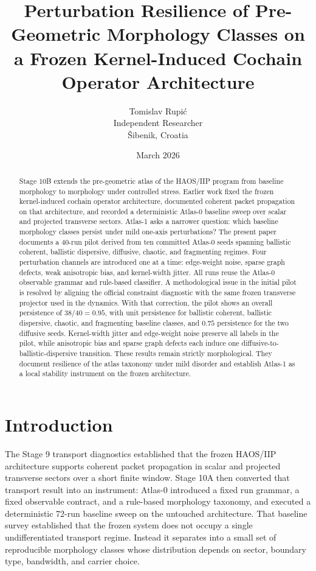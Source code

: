 \documentclass[11pt]{article}
\title{Perturbation Resilience of Pre-Geometric Morphology Classes on a Frozen Kernel-Induced Cochain Operator Architecture}
\author{Tomislav Rupi\'c\\Independent Researcher\\\v{S}ibenik, Croatia}
\date{March 2026}
\begin{document}
\maketitle

\begin{abstract}
Stage 10B extends the pre-geometric atlas of the HAOS/IIP program from baseline morphology to morphology under controlled stress. Earlier work fixed the frozen kernel-induced cochain operator architecture, documented coherent packet propagation on that architecture, and recorded a deterministic Atlas-0 baseline sweep over scalar and projected transverse sectors. Atlas-1 asks a narrower question: which baseline morphology classes persist under mild one-axis perturbations? The present paper documents a 40-run pilot derived from ten committed Atlas-0 seeds spanning ballistic coherent, ballistic dispersive, diffusive, chaotic, and fragmenting regimes. Four perturbation channels are introduced one at a time: edge-weight noise, sparse graph defects, weak anisotropic bias, and kernel-width jitter. All runs reuse the Atlas-0 observable grammar and rule-based classifier. A methodological issue in the initial pilot is resolved by aligning the official constraint diagnostic with the same frozen transverse projector used in the dynamics. With that correction, the pilot shows an overall persistence of $38/40 = 0.95$, with unit persistence for ballistic coherent, ballistic dispersive, chaotic, and fragmenting baseline classes, and $0.75$ persistence for the two diffusive seeds. Kernel-width jitter and edge-weight noise preserve all labels in the pilot, while anisotropic bias and sparse graph defects each induce one diffusive-to-ballistic-dispersive transition. These results remain strictly morphological. They document resilience of the atlas taxonomy under mild disorder and establish Atlas-1 as a local stability instrument on the frozen architecture.
\end{abstract}

\section{Introduction}
The Stage 9 transport diagnostics established that the frozen HAOS/IIP architecture supports coherent packet propagation in scalar and projected transverse sectors over a short finite window. Stage 10A then converted that transport result into an instrument: Atlas-0 introduced a fixed run grammar, a fixed observable contract, and a rule-based morphology taxonomy, and executed a deterministic 72-run baseline sweep on the untouched architecture. That baseline survey established that the frozen system does not occupy a single undifferentiated transport regime. Instead it separates into a small set of reproducible morphology classes whose distribution depends on sector, boundary type, bandwidth, and carrier choice.
\end{document}
